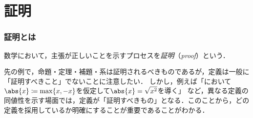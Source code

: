 \section{証明}

\subsubsection{証明とは}
数学において，主張が正しいことを示すプロセスを\emph{証明}（\emph{proof}）という．

先の例で，命題・定理・補題・系は証明されるべきものであるが，定義は一般に「証明すべきこと」でないことに注意したい．
しかし，例えば「において$\abs{x} \coloneqq \max \{ x, -x \}$を仮定して$\abs{x} = \sqrt{x^2}$を導く」
など，異なる定義の同値性を示す場面では，定義が「証明すべきもの」となる．このことから，どの定義を採用しているか明確にすることが重要であることがわかる．

